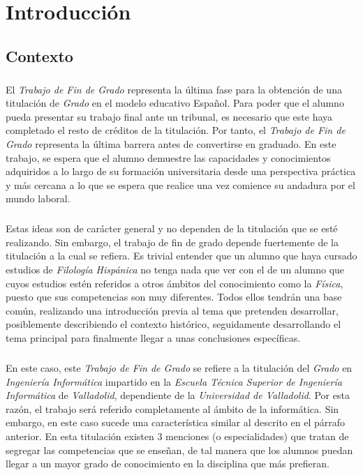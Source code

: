 \documentclass{subfiles}
\begin{document}
  \chapter{Introducción}
  \label{chap:intro}

    \section{Contexto}
    \label{sec:introduction_context}

      \paragraph{}
      El \emph{Trabajo de Fin de Grado} representa la última fase para la obtención de una titulación de \emph{Grado} en el modelo educativo Español. Para poder que el alumno pueda presentar su trabajo final ante un tribunal, es necesario que este haya completado el resto de créditos de la titulación. Por tanto, el \emph{Trabajo de Fin de Grado} representa la última barrera antes de convertirse en graduado. En este trabajo, se espera que el alumno demuestre las capacidades y conocimientos adquiridos a lo largo de su formación universitaria desde una perspectiva práctica y más cercana a lo que se espera que realice una vez comience su andadura por el mundo laboral.

      \paragraph{}
      Estas ideas son de carácter general y no dependen de la titulación que se esté realizando. Sin embargo, el trabajo de fin de grado depende fuertemente de la titulación a la cual se refiera. Es trivial entender que un alumno que haya cursado estudios de \emph{Filología Hispánica} no tenga nada que ver con el de un alumno que cuyos estudios estén referidos a otros ámbitos del conocimiento como la \emph{Física}, puesto que sus competencias son muy diferentes. Todos ellos tendrán una base común, realizando una introducción previa al tema que pretenden desarrollar, posiblemente describiendo el contexto histórico, seguidamente desarrollando el tema principal para finalmente llegar a unas conclusiones específicas.

      \paragraph{}
      En este caso, este \emph{Trabajo de Fin de Grado} se refiere a la titulación del \emph{Grado} en \emph{Ingeniería Informática} impartido en la \emph{Escuela Técnica Superior de Ingeniería Informática} de \emph{Valladolid}, dependiente de la \emph{Universidad de Valladolid}. Por esta razón, el trabajo será referido completamente al ámbito de la informática. Sin embargo, en este caso sucede una característica similar al descrito en el párrafo anterior. En esta titulación existen 3 menciones (o especialidades) que tratan de segregar las competencias que se enseñan, de tal manera que los alumnos puedan llegar a un mayor grado de conocimiento en la disciplina que más prefieran.
\end{document}
